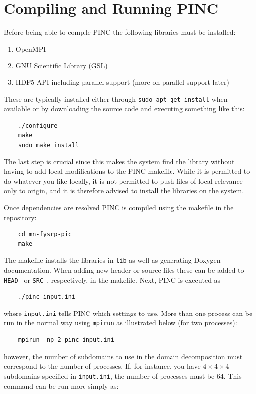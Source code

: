 \documentclass[10pt,a4paper]{article}
\begin{document}
\section{Compiling and Running PINC}\label{sec:dependencies}
Before being able to compile PINC the following libraries must be installed:
\begin{enumerate}
	\item OpenMPI
	\item GNU Scientific Library (GSL)
	\item HDF5 API including parallel support (more on parallel support later)
\end{enumerate}
These are typically installed either through \verb$sudo apt-get install$ when available or by downloading the source code and executing something like this:

\begin{verbatim}
	./configure
	make
	sudo make install
\end{verbatim}
The last step is crucial since this makes the system find the library without having to add local modifications to the PINC makefile. While it is permitted to do whatever you like locally, it is not permitted to push files of local relevance only to origin, and it is therefore advised to install the libraries on the system.

Once dependencies are resolved PINC is compiled using the makefile in the repository:

\begin{verbatim}
	cd mn-fysrp-pic
	make
\end{verbatim}
The makefile installs the libraries in \verb$lib$ as well as generating Doxygen documentation. When adding new header or source files these can be added to \verb$HEAD_$ or \verb$SRC_$, respectively, in the makefile. Next, PINC is executed as

\begin{verbatim}
	./pinc input.ini
\end{verbatim}
where \verb$input.ini$ tells PINC which settings to use. More than one process can be run in the normal way using \verb$mpirun$ as illustrated below (for two processes):

\begin{verbatim}
	mpirun -np 2 pinc input.ini
\end{verbatim}
however, the number of subdomains to use in the domain decomposition must correspond to the number of processes. If, for instance, you have $4\times 4\times 4$ subdomains specified in \verb$input.ini$, the number of processes must be 64. This command can be run more simply as:
\end{document}
